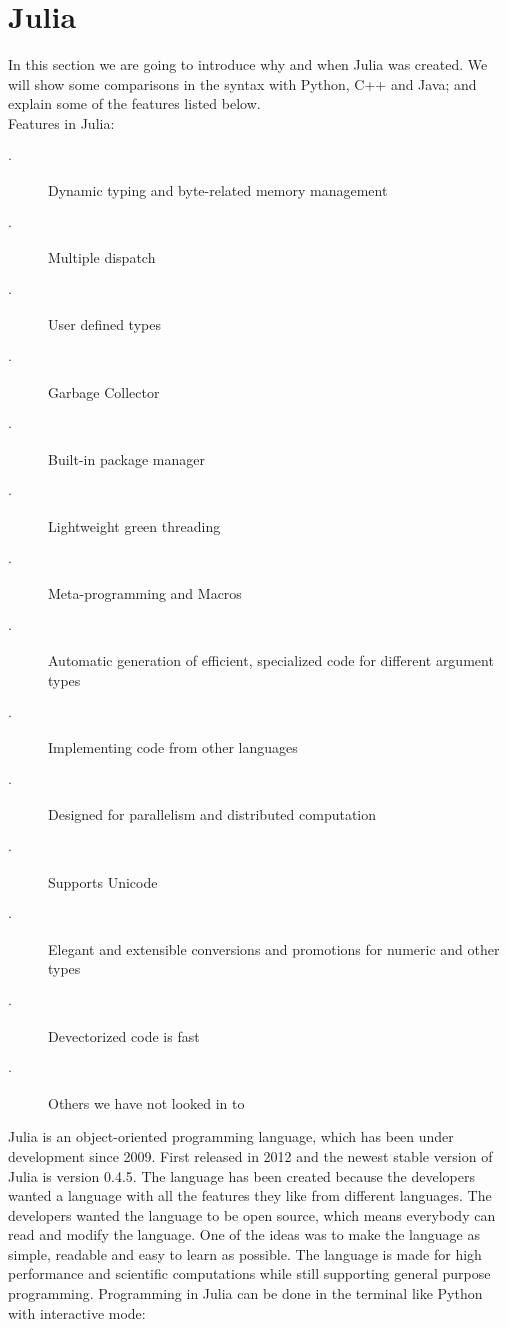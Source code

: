 \documentclass[a4paper, 11pt, titlepage]{article}
\begin{document}
\section{Julia}
In this section we are going to introduce why and when Julia was created. We will show some comparisons in the syntax with Python, C++ and Java; and explain some of the features listed below.\\
Features in Julia:
\begin{description}
	\item[$\cdot$] Dynamic typing and byte-related memory management
	\item[$\cdot$] Multiple dispatch
	\item[$\cdot$] User defined types
	\item[$\cdot$] Garbage Collector
	\item[$\cdot$] Built-in package manager
	\item[$\cdot$] Lightweight green threading
	\item[$\cdot$] Meta-programming and Macros
	\item[$\cdot$] Automatic generation of efficient, specialized code for different argument types
	\item[$\cdot$] Implementing code from other languages
	\item[$\cdot$] Designed for parallelism and distributed computation
	\item[$\cdot$] Supports Unicode
	\item[$\cdot$] Elegant and extensible conversions and promotions for numeric and other types
	\item[$\cdot$] Devectorized code is fast
	\item[$\cdot$] Others we have not looked in to
\end{description}
Julia is an object-oriented programming language, which has been under development since 2009. First released in 2012 and the newest stable version of Julia is version 0.4.5.  The language has been created because the developers wanted a language with all the features they like from different languages. The developers wanted the language to be open source, which means everybody can read and modify the language. One of the ideas was to make the language as simple, readable and easy to learn as possible. The language is made for high performance and scientific computations while still supporting general purpose programming. 
Programming in Julia can be done in the terminal like Python with interactive mode:
\end{document}
